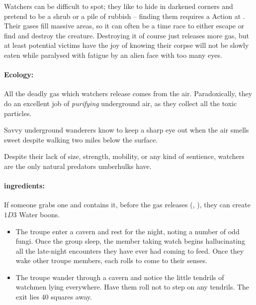 \begin{multicols}{2}
Watchers can be difficult to spot; they like to hide in darkened corners and pretend to be a shrub or a pile of rubbish -- finding them requires a  Action at \tn[10].
Their gases fill massive areas, so it can often be a time race to either escape or find and destroy the creature.
Destroying it of course just releases more gas, but at least potential victims have the joy of knowing their corpse will not be slowly eaten while paralysed with fatigue by an alien face with too many eyes.

\paragraph{Ecology:}
All the deadly gas which watchers release comes from the air.
Paradoxically, they do an excellent job of \emph{purifying} underground air, as they collect all the toxic particles.

Savvy underground wanderers know to keep a sharp eye out when the air smells sweet despite walking two miles below the surface.

Despite their lack of size, strength, mobility, or any kind of sentience, watchers are the only natural predators umberhulks have.


\watcher

\paragraph{\Glspl{ingredient}:}
If someone grabs one and contains it, before the gas releases (, \tn[10]), they can create $1D3$ Water \glspl{boon}.

\showEnc[plant]

\begin{itemize}

  \item
  The troupe enter a cavern and rest for the night, noting a number of odd fungi.
  Once the group sleep, the member taking watch begins hallucinating all the late-night encounters they have ever had coming to feed.
  Once they wake other troupe members, each rolls to come to their senses.
  \item
  The troupe wander through a cavern and notice the little tendrils of watchmen lying everywhere.
  Have them roll  not to step on any tendrils.
  The exit lies 40 squares away.

\end{itemize}

\end{multicols}

